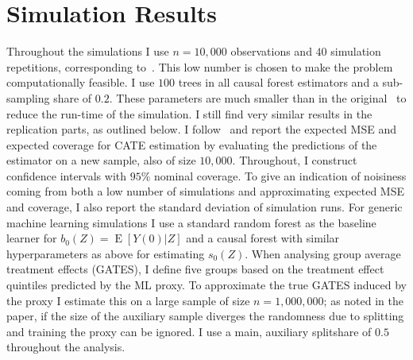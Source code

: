 \documentclass[11pt, a4paper, leqno]{article}
\DeclareMathOperator{\E}{E}
\begin{document}
\section{Simulation Results}
Throughout the simulations I use $n=10,000$ observations and $40$ simulation repetitions, corresponding to~\citet{wager2018estimation}.
This low number is chosen to make the problem computationally feasible.
I use $100$ trees in all causal forest estimators and a sub-sampling share of $0.2$.
These parameters are much smaller than in the original~\citet{wager2018estimation} to reduce the run-time of the simulation.
I still find very similar results in the replication parts, as outlined below.
I follow~\citet{wager2018estimation} and report the expected MSE and expected coverage for CATE estimation by evaluating the predictions of the estimator on a new sample, also of size $10,000$.
Throughout, I construct confidence intervals with $95\%$ nominal coverage.
To give an indication of noisiness coming from both a low number of simulations and approximating expected MSE and coverage, I also report the standard deviation of simulation runs.
For generic machine learning simulations I use a standard random forest as the baseline learner for $b_0(Z) = \E[Y(0)|Z]$ and a causal forest with similar hyperparameters as above for estimating $s_0(Z)$.
When analysing group average treatment effects (GATES), I define five groups based on the treatment effect quintiles predicted by the ML proxy.
To approximate the true GATES induced by the proxy I estimate this on a large sample of size $n=1,000,000$; as noted in the paper, if the size of the auxiliary sample diverges the randomness due to splitting and training the proxy can be ignored.
I use a main, auxiliary splitshare of $0.5$ throughout the analysis.
\end{document}
